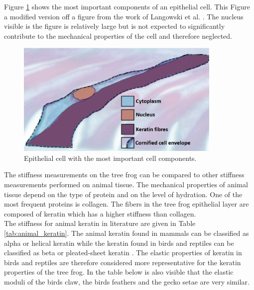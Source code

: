 \qquad Figure \ref{fig:epithelial_cell_components} shows the most important components of an epithelial cell. This Figure a modified version off a figure from the work of Langowski et al. \cite{langowski2018force}. The nucleus visible is the figure is relatively large but is not expected to significantly contribute to the mechanical properties of the cell and therefore neglected.

\begin{figure}
    \includegraphics[width=0.60\linewidth, height=5.5cm, angle=0]{images/epidermal structure/cell_langowski_modified.PNG}
    \caption{Epithelial cell with the most important cell components.}
    \label{fig:epithelial_cell_components}
\end{figure}

 
\qquad The stiffness measurements on the tree frog can be compared to other stiffness measurements performed on animal tissue. The mechanical properties of animal tissue depend on the type of protein and on the level of hydration. One of the most frequent proteins is collagen. The fibers in the tree frog epithelial layer are composed of keratin which has a higher stiffness than collagen.\\
 
\qquad The stiffness for animal keratin in literature are given in Table \ref{tab:animal_keratin}. The animal keratin found in mammals can be classified as alpha or helical keratin while the keratin found in birds and reptiles can be classified as beta or pleated-sheet keratin \cite{bonser2000young}. The elastic properties of keratin in birds and reptiles are therefore considered more representative for the keratin properties of the tree frog. In the table below is also visible that the elastic moduli of the birds claw, the birds feathers and the gecko setae are very similar.\\

